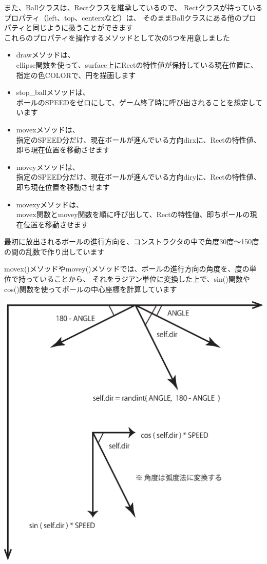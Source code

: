\documentclass[uplatex,a4paper,11pt,oneside,openany]{jsbook}
\begin{document}
また、Ballクラスは、Rectクラスを継承しているので、
Rectクラスが持っているプロパティ（left、top、centerxなど）は、
そのままBallクラスにある他のプロパティと同じように扱うことができます\\

これらのプロパティを操作するメソッドとして次の5つを用意しました

\begin{itemize}
  \item drawメソッドは、\\ellipse関数を使って、surface上にRectの特性値が保持している現在位置に、指定の色COLORで、円を描画します
  \item stop\_ballメソッドは、\\ボールのSPEEDをゼロにして、ゲーム終了時に呼び出されることを想定しています
  \item movexメソッドは、\\指定のSPEED分だけ、現在ボールが進んでいる方向dirxに、Rectの特性値、即ち現在位置を移動させます
  \item moveyメソッドは、\\指定のSPEED分だけ、現在ボールが進んでいる方向diryに、Rectの特性値、即ち現在位置を移動させます
  \item movexyメソッドは、\\movex関数とmovey関数を順に呼び出して、Rectの特性値、即ちボールの現在位置を移動させます
\end{itemize}

最初に放出されるボールの進行方向を、コンストラクタの中で角度30度〜150度の間の乱数で作り出しています

movex()メソッドやmovey()メソッドでは、ボールの進行方向の角度を、度の単位で持っていることから、
それをラジアン単位に変換した上で、sin()関数やcos()関数を使ってボールの中心座標を計算しています

\begin{center}
  \includegraphics[width=0.4\hsize]{figures/eps/startball.eps}
\end{center}
\end{document}
